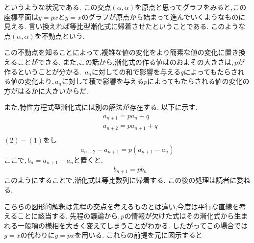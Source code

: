
    というような状況である.
    この交点$(\alpha,\alpha)$を原点と思ってグラフをみると,この座標平面は$y=px$と$y=x$のグラフが原点から始まって進んでいくようなものに見える.
    言い換えれば等比型漸化式に帰着させたということである.
    このような点$(\alpha,\alpha)$を不動点という.

    この不動点を知ることによって,複雑な値の変化をより簡素な値の変化に置き換えることができる.
    また,この話から,漸化式の作る値はのおよその大きさは,\,$p$が作るということが分かる.
    \,$a_n$に対しての和で影響を与える$q$によってもたらされる値の変化より,\,$a_n$に対して積で影響を与える$p$によってもたらされる値の変化の方がはるかに大きいからだ.

    また,特性方程式型漸化式には別の解法が存在する.
    以下に示す.
    \begin{align*}
      &a_{n+1}=pa_n+q \tag*{\(\cdots\) (1)}\\
      &a_{n+2}=pa_{n+1}+q \tag*{\(\cdots\) (2)}\\
    \end{align*}
    $(2)-(1)$をし
    \[
      a_{n+2}-a_{n+1}=p(a_{n+1}-a_n)
    \]
    ここで,\,$b_n=a_{n+1}-a_n$と置くと,
    \begin{align*}
      &b_{n+1}=pb_n
    \end{align*}
    このようにすることで,漸化式は等比数列に帰着する.
    この後の処理は読者に委ねる.

    こちらの図形的解釈は先程の交点を考えるものとは違い,今度は平行な直線を考えることに該当する.
    先程の議論から,\,$p$の情報が欠けた式はその漸化式から生まれる一般項の様相を大きく変えてしまうことがわかる.
    したがってこの場合では$y=x$の代わりに$y=px$を用いる.
    これらの前提を元に図示すると

